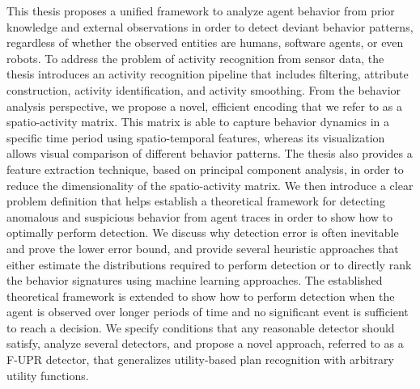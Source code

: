 %
%
This thesis proposes a unified framework to analyze agent behavior from prior knowledge and external observations in order to detect deviant behavior patterns, regardless of whether the observed entities are humans, software agents, or even robots. To address the problem of activity recognition from sensor data, the thesis introduces an activity recognition pipeline that includes filtering, attribute construction, activity identification, and activity smoothing. %
%
From the behavior analysis perspective, we propose a novel, efficient encoding that we refer to as a spatio-activity matrix. This matrix is able to capture behavior dynamics in a specific time period using spatio-temporal features, whereas its visualization allows visual comparison of different  behavior patterns. The thesis also provides a feature extraction technique, based on principal component analysis, in order to reduce the dimensionality of the spatio-activity matrix. We then introduce a clear problem definition that helps establish a theoretical framework for detecting anomalous and suspicious behavior from agent traces in order to show how to optimally perform detection. We discuss why detection error is often inevitable and prove the lower error bound, and provide several heuristic approaches that either estimate the distributions required to perform detection or to directly rank the behavior signatures using machine learning approaches. The established theoretical framework is extended to show how to perform detection when the agent is observed over longer periods of time and no significant event is sufficient to reach a decision. We specify conditions that any reasonable detector should satisfy, analyze several detectors, and propose a novel approach, referred to as a F-UPR detector, that generalizes utility-based plan recognition with arbitrary utility functions.
